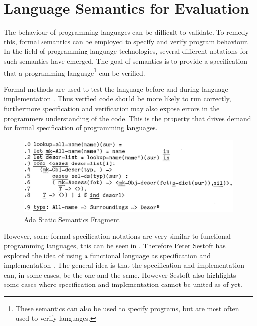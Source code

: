 \section{Language Semantics for Evaluation} \label{sec:language-semenatics} 
The behaviour of programming languages can be difficult to validate. To remedy this, formal semantics can be employed to specify and verify program behaviour. In the field of programming-language technologies, several different notations for such semantics have emerged. The goal of semantics is to provide a specification that a programming language\footnote{These semantics can also be used to specify programs, but are most often used to verify languages.} can be verified. 


Formal methods are used to test the language before and during language implementation \cite{hierons2009using}.  Thus verified code should be more likely to run correctly, furthermore specification and verification may also expose errors in the programmers understanding of the code. This is the property that drives demand for formal specification of programming languages. 

\begin{figure}[H]
    \includegraphics[width=.95\textwidth]{images/vdm-lookup-all-name.png}
    \caption{Ada Static Semantics Fragment \cite{sestoft:isola}}
    \label{fig:ada-semantic}
\end{figure}

However, some formal-specification notations are very similar to functional programming languages, this can be seen in . Therefore Peter Sestoft has explored the idea of using a functional language as specification and implementation \cite{sestoft:isola}. The general idea is that the specification and implementation can, in some cases, be the one and the same. However Sestoft also highlights some cases where specification and implementation cannot be united as of yet.

